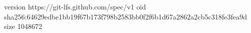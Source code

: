 version https://git-lfs.github.com/spec/v1
oid sha256:64629edbe1bb19f67b173f798b2583bb0f2f6b1d67a2862a2cb5c318fe3fea9d
size 1048672
